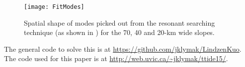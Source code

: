 \documentclass[12pt]{article}
\begin{document}
\begin{appendix}
\begin{figure}[htbp]
  \begin{center}
    \texttt{[image: FitModes]}
    \caption{Spatial shape of modes picked out from the resonant searching technique (as shown in ) for the 70, 40 and 20-km wide slopes.  
            \label{fig:FitModes} }
  \end{center}
\end{figure}

The general code to solve this is at \url{https://github.com/jklymak/LindzenKuo}.  The code used for this paper is at \url{http://web.uvic.ca/~jklymak/ttide15/}.  

%
%
%
%
%
%
\end{appendix}

{}
{\clearpage}




%
\end{document}

